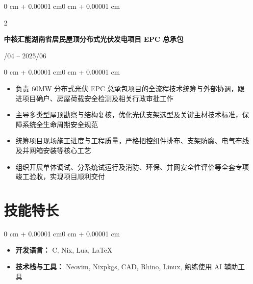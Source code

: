 \documentclass[10pt, letterpaper]{article}
\newenvironment{highlights}{
    \begin{itemize}[
        topsep=0.10 cm,
        parsep=0.10 cm,
        partopsep=0pt,
        itemsep=0pt,
        leftmargin=10pt
    ]
}{
    \end{itemize}
}
\newenvironment{onecolentry}{
    \begin{adjustwidth}{0 cm + 0.00001 cm}{0 cm + 0.00001 cm}
}{
    \end{adjustwidth}
}
\newenvironment{twocolentry}[2][]{
    \onecolentry
    \def\secondColumn{#2}
    \setcolumnwidth{\fill, 4.5 cm}
    \begin{paracol}{2}
}{
    \switchcolumn \raggedleft \secondColumn
    \end{paracol}
    \endonecolentry
}
\begin{document}
    \vspace{0.20 cm}

    \begin{twocolentry}{2024/04 – 2025/06}
        \textbf{中核汇能湖南省居民屋顶分布式光伏发电项目 EPC 总承包}
    \end{twocolentry}

    \vspace{0.10 cm}
    \begin{onecolentry}
        \begin{highlights}
            \item 负责 60MW 分布式光伏 EPC 总承包项目的全流程技术统筹与外部协调，跟进项目确户、房屋荷载安全检测及相关行政审批工作
            \item 主导多类型屋顶勘察与结构复核，优化光伏支架选型及关键主材技术标准，保障系统全生命周期安全规范
            \item 统筹项目现场施工进度与工程质量，严格把控组件排布、支架防腐、电气布线及并网箱安装等核心工艺
            \item 组织开展单体调试、分系统试运行及消防、环保、并网安全性评价等全套专项竣工验收，实现项目顺利交付
        \end{highlights}
    \end{onecolentry}

    \section{技能特长}
    \begin{onecolentry}
        \begin{highlights}
            \item \textbf{开发语言：} C, Nix, Lua, LaTeX
            \item \textbf{技术栈与工具：} Neovim, Nixpkgs, CAD, Rhino, Linux, 熟练使用 AI 辅助工具
        \end{highlights}
    \end{onecolentry}
\end{document}
